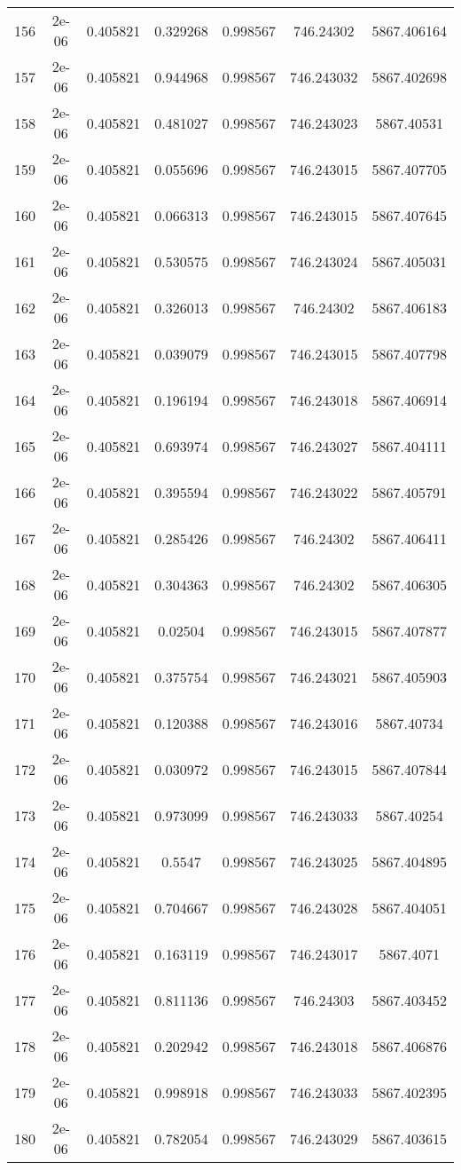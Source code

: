 \begin{table}
\begin{tabular*}{\linewidth}{c|c|c|c|c|c|c}
156 & 2e-06 & 0.405821 & 0.329268 & 0.998567 & 746.24302 & 5867.406164\\
157 & 2e-06 & 0.405821 & 0.944968 & 0.998567 & 746.243032 & 5867.402698\\
158 & 2e-06 & 0.405821 & 0.481027 & 0.998567 & 746.243023 & 5867.40531\\
159 & 2e-06 & 0.405821 & 0.055696 & 0.998567 & 746.243015 & 5867.407705\\
160 & 2e-06 & 0.405821 & 0.066313 & 0.998567 & 746.243015 & 5867.407645\\
161 & 2e-06 & 0.405821 & 0.530575 & 0.998567 & 746.243024 & 5867.405031\\
162 & 2e-06 & 0.405821 & 0.326013 & 0.998567 & 746.24302 & 5867.406183\\
163 & 2e-06 & 0.405821 & 0.039079 & 0.998567 & 746.243015 & 5867.407798\\
164 & 2e-06 & 0.405821 & 0.196194 & 0.998567 & 746.243018 & 5867.406914\\
165 & 2e-06 & 0.405821 & 0.693974 & 0.998567 & 746.243027 & 5867.404111\\
166 & 2e-06 & 0.405821 & 0.395594 & 0.998567 & 746.243022 & 5867.405791\\
167 & 2e-06 & 0.405821 & 0.285426 & 0.998567 & 746.24302 & 5867.406411\\
168 & 2e-06 & 0.405821 & 0.304363 & 0.998567 & 746.24302 & 5867.406305\\
169 & 2e-06 & 0.405821 & 0.02504 & 0.998567 & 746.243015 & 5867.407877\\
170 & 2e-06 & 0.405821 & 0.375754 & 0.998567 & 746.243021 & 5867.405903\\
171 & 2e-06 & 0.405821 & 0.120388 & 0.998567 & 746.243016 & 5867.40734\\
172 & 2e-06 & 0.405821 & 0.030972 & 0.998567 & 746.243015 & 5867.407844\\
173 & 2e-06 & 0.405821 & 0.973099 & 0.998567 & 746.243033 & 5867.40254\\
174 & 2e-06 & 0.405821 & 0.5547 & 0.998567 & 746.243025 & 5867.404895\\
175 & 2e-06 & 0.405821 & 0.704667 & 0.998567 & 746.243028 & 5867.404051\\
176 & 2e-06 & 0.405821 & 0.163119 & 0.998567 & 746.243017 & 5867.4071\\
177 & 2e-06 & 0.405821 & 0.811136 & 0.998567 & 746.24303 & 5867.403452\\
178 & 2e-06 & 0.405821 & 0.202942 & 0.998567 & 746.243018 & 5867.406876\\
179 & 2e-06 & 0.405821 & 0.998918 & 0.998567 & 746.243033 & 5867.402395\\
180 & 2e-06 & 0.405821 & 0.782054 & 0.998567 & 746.243029 & 5867.403615\\
\end{tabular*}
\end{table}
